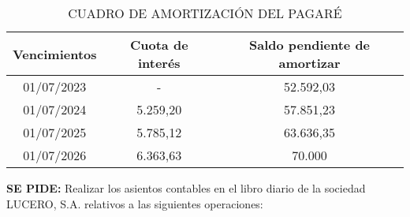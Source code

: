 \begin{table}[H]
\centering
\begin{tabular}{|c|c|c|}
\hline
\textbf{Vencimientos} & \textbf{Cuota de interés} & \textbf{Saldo pendiente de amortizar} \\ \hline
01/07/2023 & - & 52.592,03 \\ \hline
01/07/2024 & 5.259,20 & 57.851,23 \\ \hline
01/07/2025 & 5.785,12 & 63.636,35 \\ \hline
01/07/2026 & 6.363,63 & 70.000 \\ \hline
\end{tabular}
\caption{CUADRO DE AMORTIZACIÓN DEL PAGARÉ}
\end{table}

\textbf{SE PIDE:} Realizar los asientos contables en el libro diario de la sociedad LUCERO, S.A. relativos a las siguientes operaciones:

